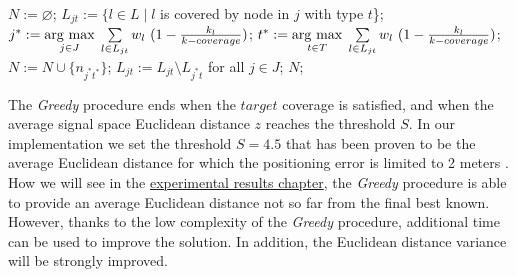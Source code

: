 \begin{algorithm}
\caption{\(Greedy(L, J, T, w, target)\)}
\begin{algorithmic}%
\label{alg:greedy}
\State $N := \varnothing$;
\State $L_{jt} := \{l \in L \mid l$ is covered by node in \(j\) with type \(t\)\};
\State $j^{*} := \underset{j \in J}{\operatorname{arg}\,\operatorname{max}}\; \sum\limits_{l \in L_{jt}}w_l ~ (1 - \frac{k_l}{k-coverage})$;
\State $t^{*} := \underset{t \in T}{\operatorname{arg}\,\operatorname{max}}\; \sum\limits_{l \in L_{jt}}w_l ~ (1 - \frac{k_l}{k-coverage})$;
\State $N := N \cup \{n_{j^*t^*}\}$;
\State $L_{jt} := L_{jt} \setminus L_{j^*t}$ for all $j \in J$;
\EndWhile
\State \Return $N$;
\end{algorithmic}
\end{algorithm}

The \emph{Greedy} procedure ends when the $target$ coverage is satisfied, and when the average signal space Euclidean distance $z$ reaches the threshold $S$. In our implementation we set the threshold $S=4.5$ that has been proven to be the average Euclidean distance for which the positioning error is limited to 2 meters \cite{He2011}.
How we will see in the {\hyperref[cap:results]{experimental results chapter}}, the \emph{Greedy} procedure is able to provide an average Euclidean distance not so far from the final best known. However, thanks to the low complexity of the \emph{Greedy} procedure, additional time can be used to improve the solution. In addition, the Euclidean distance variance will be strongly improved.

